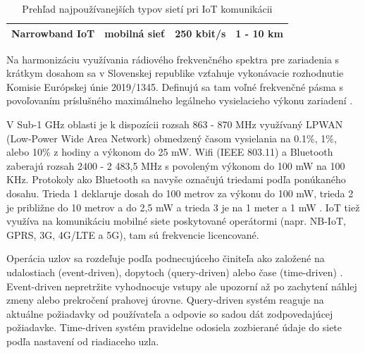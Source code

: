 \begin{table}[h]
\begin{tabular}{|l|r|rr|r|}
Narrowband IoT                                                                   & \multicolumn{1}{l|}{mobilná sieť}                                                                 & \multicolumn{2}{r|}{250 kbit/s}                                                                                                                                                                 & \multicolumn{1}{l|}{1 - 10 km}                                                          \\ \hline
\end{tabular}
\caption{Prehľad najpoužívanejších typov sietí pri IoT komunikácii}
\label{tab:net-protocols}
\end{table}

Na harmonizáciu využívania rádiového frekvenčného spektra pre zariadenia s krátkym dosahom sa v
Slovenskej republike vzťahuje vykonávacie rozhodnutie Komisie Európskej únie 2019/1345. Definujú sa
tam voľné frekvenčné pásma s povoľovaním príslušného maximálneho legálneho vysielacieho výkonu
zariadení \cite{eu-frequencies}.

V Sub-1 GHz oblasti je k dispozícii rozsah 863 - 870 MHz využívaný LPWAN (Low-Power Wide Area Network) obmedzený
časom vysielania na 0.1\%, 1\%, alebo 10\% z hodiny a výkonom do 25 mW. Wifi (IEEE 803.11) a Bluetooth zaberajú
rozsah 2400 - 2 483,5 MHz s povoleným výkonom do 100 mW na 100 KHz. Protokoly
ako Bluetooth sa navyše označujú triedami podľa ponúkaného dosahu. Trieda 1 deklaruje dosah do 100 metrov za výkonu
do 100 mW, trieda 2 je približne do 10 metrov a do 2,5 mW a trieda 3 je na 1 meter a 1 mW \cite{bluetooth}.
IoT tiež využíva na komunikáciu mobilné siete poskytované operátormi (napr. NB-IoT, GPRS, 3G, 4G/LTE a 5G),
tam sú frekvencie licencované.

Operácia uzlov sa rozdeľuje podľa podnecujúceho činiteľa ako založené na udalostiach (event-driven),
dopytoch (query-driven) alebo čase (time-driven) \cite{big-data-collection-wsn}. Event-driven
nepretržite vyhodnocuje vstupy ale upozorní až po zachytení náhlej zmeny alebo prekročení prahovej úrovne.
Query-driven systém reaguje na aktuálne požiadavky od používateľa a odpovie so sadou dát zodpovedajúcej požiadavke.
Time-driven systém pravidelne odosiela zozbierané údaje do siete podľa nastavení od riadiaceho uzla.

